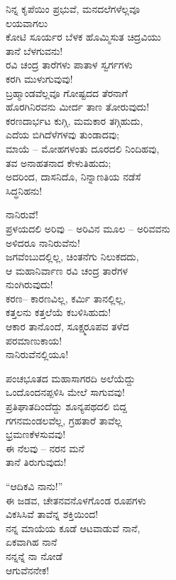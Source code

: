 ನಿನ್ನ ಕೃಪೆಯಿಂ ಪ್ರಭುವೆ, ಮನದಲೆಗಳೆಲ್ಲವೂ\\ಲಯವಾಗಲು\\ಕೋಟಿ ಸೂರ್ಯರ ಬೆಳಕ ಹೊಮ್ಮಿಸುತ ಚಿದ್ರವಿಯು\\ತಾನೆ ಬೆಳಗುವನು!\\ರವಿ ಚಂದ್ರ ತಾರೆಗಳು ಪಾತಾಳ ಸ್ವರ್ಗಗಳು\\ಕರಗಿ ಮುಳುಗುವುವು!\\ಬ್ರಹ್ಮಾಂಡವೆಲ್ಲವೂ ಗೋಷ್ಟದದ ತೆರನಾಗೆ\\ಹೊರಗಿನಿರವನು ಮೀರ್ದ ತಾಣ ತೋರುವುದು!\\
 ಕರಣದಾರ್ಭಟ ಕುಗ್ಗಿ, ಮಮಕಾರ ತಗ್ಗಿಹುದು,\\ಎದೆಯ ಬಿಗಿದೆಳೆಗಳವು ತುಂಡಾದವು;\\ಮಾಯೆ – ಮೋಹಗಳಂತು ದೂರದಲಿ ನಿಂದಿಹವು,\\ತವ ಅನಾಹತನಾದ ಕೇಳುತಿಹುದು;\\ಅದರಿಂದ, ದಾಸನಿದೊ, ನಿನ್ನಾಣತಿಯ ನಡೆಸೆ\\ಸಿದ್ಧನಿಹನು!

ನಾನಿರುವೆ!\\ಪ್ರಳಯದಲಿ ಅರಿವು – ಅರಿವಿನ ಮೂಲ – ಅರಿವವನು\\ಅಳಿದರೂ ನಾನಿರುವೆನು!\\ಜಗವೆಂಬುದಲ್ಲಿಲ್ಲ, ಚಿಂತನೆಗು ನಿಲುಕದದು,\\ಆ ಮಹಾನಿರ್ವಾಣ ರವಿ ಚಂದ್ರ ತಾರೆಗಳ\\ನುಂಗಿರುವುದು!\\ಕರಣ– ಕಾರಣವಿಲ್ಲ, ಕರ್ಮಿ ತಾನಲ್ಲಿಲ್ಲ,\\ಕತ್ತಲನು ಕತ್ತಲೆಯೆ ಕಬಳಿಸಿಹುದು!\\ಆಕಾರ ತಾನೊಂದೆ, ಸೂಕ್ಷ್ಮರೂಪವ ತಳೆದ\\ಪರಮಾಣುಕಾಯ!\\ನಾನಿರುವೆನಲ್ಲಿಯೂ!

ಪಂಚಭೂತದ ಮಹಾಸಾಗರದಿ ಅಲೆಯೆದ್ದು\\ಒಂದೊಂದನಪ್ಪಳಿಸಿ ಮೇಲೆ ಸಾಗುವವು!\\ಪ್ರತಿಘಾತದಿಂದೆದ್ದು ಶೂನ್ಯಪಥದಲಿ ಬಿದ್ದ\\ಗಗನಮಂಡಲವೆಲ್ಲ, ಗ್ರಹತಾರೆ ತಾವೆಲ್ಲ\\ಭ್ರಮಣಕೆಳಸುವವು!\\ಈ ನೆಲವು – ನರನ ಮನೆ\\ತಾನೆ ತಿರುಗುವುದು!

“ಆದಿಕವಿ ನಾನು!”\\ಈ ಜಡವ, ಚೇತನವನೊಳಗೊಂಡ ರೂಪಗಳು\\ವಿಕಸಿಸಿವೆ ತಾವೆನ್ನ ಶಕ್ತಿಯಿಂದ!\\ನನ್ನ ಮಾಯೆಯ ಕೂಡೆ ಆಟವಾಡುವೆ ನಾನೆ,\\ಏಕವಾಗಿಹ ನಾನೆ\\ನನ್ನನ್ನೆ ನಾ ನೋಡೆ\\ಆಗುವೆನನೇಕ!\\

